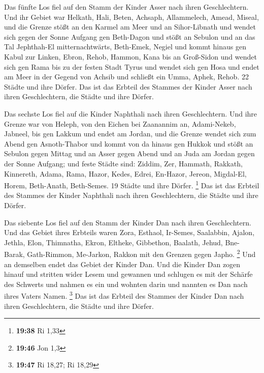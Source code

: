  Das fünfte Los fiel auf den Stamm der Kinder Asser nach
ihren Geschlechtern.  Und ihr Gebiet war Helkath, Hali,
Beten, Achsaph,  Allammelech, Amead, Miseal, und die Grenze
stößt an den Karmel am Meer und an Sihor-Libnath  und
wendet sich gegen der Sonne Aufgang gen Beth-Dagon und stößt an Sebulon
und an das Tal Jephthah-El mitternachtwärts, Beth-Emek, Negiel und kommt
hinaus gen Kabul zur Linken,  Ebron, Rehob, Hammon, Kana
bis an Groß-Sidon  und wendet sich gen Rama bis zu der
festen Stadt Tyrus und wendet sich gen Hosa und endet am Meer in der
Gegend von Achsib  und schließt ein Umma, Aphek, Rehob. 22
Städte und ihre Dörfer.  Das ist das Erbteil des Stammes
der Kinder Asser nach ihren Geschlechtern, die Städte und ihre Dörfer.

 Das sechste Los fiel auf die Kinder Naphthali nach ihren
Geschlechtern.  Und ihre Grenze war von Heleph, von den
Eichen bei Zaanannim an, Adami-Nekeb, Jabneel, bis gen Lakkum und endet
am Jordan,  und die Grenze wendet sich zum Abend gen
Asnoth-Thabor und kommt von da hinaus gen Hukkok und stößt an Sebulon
gegen Mittag und an Asser gegen Abend und an Juda am Jordan gegen der
Sonne Aufgang;  und feste Städte sind: Ziddim, Zer,
Hammath, Rakkath, Kinnereth,  Adama, Rama, Hazor,
 Kedes, Edrei, En-Hazor,  Jereon, Migdal-El,
Horem, Beth-Anath, Beth-Semes. 19 Städte und ihre Dörfer. \footnote{\textbf{19:38}
  Ri 1,33}  Das ist das Erbteil des Stammes der Kinder
Naphthali nach ihren Geschlechtern, die Städte und ihre Dörfer.

 Das siebente Los fiel auf den Stamm der Kinder Dan nach
ihren Geschlechtern.  Und das Gebiet ihres Erbteils waren
Zora, Esthaol, Ir-Semes,  Saalabbin, Ajalon, Jethla,
 Elon, Thimnatha, Ekron,  Eltheke, Gibbethon,
Baalath,  Jehud, Bne-Barak, Gath-Rimmon, 
Me-Jarkon, Rakkon mit den Grenzen gegen Japho. \footnote{\textbf{19:46}
  Jon 1,3}  Und an demselben endet das Gebiet der Kinder
Dan. Und die Kinder Dan zogen hinauf und stritten wider Lesem und
gewannen und schlugen es mit der Schärfe des Schwerts und nahmen es ein
und wohnten darin und nannten es Dan nach ihres Vaters Namen.
\footnote{\textbf{19:47} Ri 18,27; Ri 18,29}  Das ist das
Erbteil des Stammes der Kinder Dan nach ihren Geschlechtern, die Städte
und ihre Dörfer.

